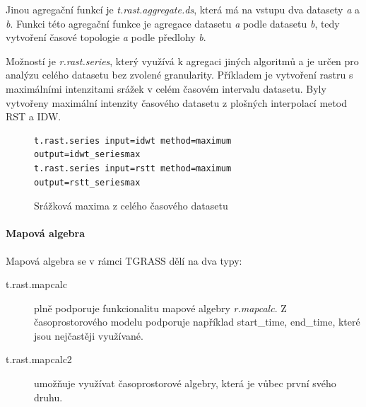 \documentclass[a4paper,12pt,oneside]{report}
\begin{document}
Jinou agregační funkcí je \textit{t.rast.aggregate.ds}, která má na
vstupu dva datasety \emph{a} a \emph{b}. Funkci této agregační funkce
je agregace datasetu \emph{a} podle datasetu \emph{ b}, tedy vytvoření
časové topologie \emph{a} podle předlohy \emph{b}.

Možností je \textit{r.rast.series}, který využívá k agregaci jiných
algoritmů a je určen pro analýzu celého datasetu bez zvolené
granularity.  Příkladem je vytvoření rastru s maximálními intenzitami
srážek v celém časovém intervalu datasetu. Byly vytvořeny maximální
intenzity časového datasetu z plošných interpolací metod RST a IDW.


\begin{figure}[h!]
\begin{footnotesize}
\lstset{extendedchars=false,
escapeinside=''}
\begin{lstlisting}[style=mybash]
t.rast.series input=idwt method=maximum output=idwt_seriesmax           
t.rast.series input=rstt method=maximum output=rstt_seriesmax    
\end{lstlisting}
\end{footnotesize} 
\end{figure}


\begin{figure}[h!]%
    \centering
    \qquad

    \caption[Serie max]{ Srážková maxima z celého časového datasetu  \centering }
\end{figure}




\paragraph*{Mapová algebra}
Mapová algebra se v rámci TGRASS dělí na dva typy:
\begin{description}
\item [t.rast.mapcalc] plně podporuje funkcionalitu mapové algebry \textit{r.mapcalc}. Z časo\-prostorového modelu podporuje například start\_time, end\_time, které jsou nejčastěji využívané.
\item [t.rast.mapcalc2] umožňuje využívat časoprostorové algebry, která je vůbec první svého druhu.
\end{description}
\end{document}
